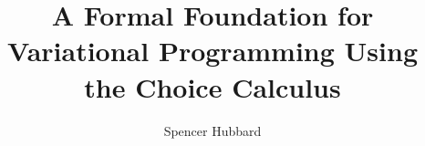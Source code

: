 \documentclass[12pt,oneside]{book}
\title{A Formal Foundation for Variational Programming Using the Choice Calculus}
\author{Spencer Hubbard}
\theoremstyle{definition}
\begin{document}
\iftoggle{Pretty}
  {}
  {}
%

\mainmatter




\cleardoublepage

\appendix


\end{document}
